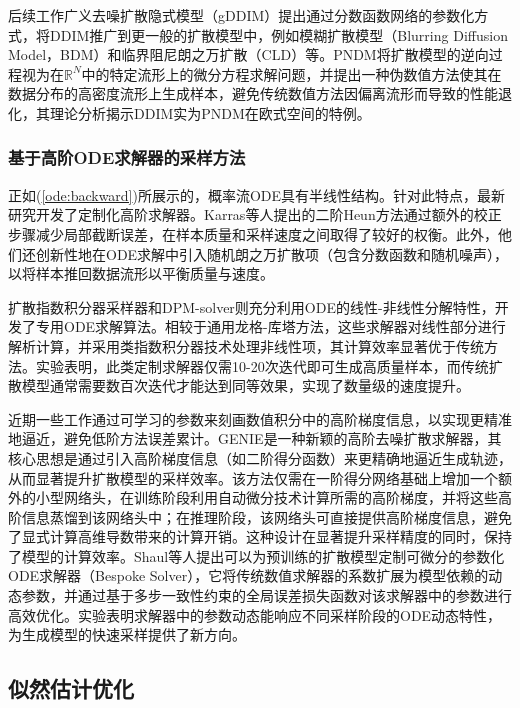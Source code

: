 \documentclass[11pt,a4paper,UTF8]{ctexart}
\begin{document}
后续工作广义去噪扩散隐式模型（gDDIM）\cite{zhang2022gddim}提出通过分数函数网络的参数化方式，将DDIM推广到更一般的扩散模型中，例如模糊扩散模型（Blurring Diffusion Model，BDM）\cite{Hoogeboom2023blurring}和临界阻尼朗之万扩散（CLD）\cite{dockhorn2021score}等。PNDM\cite{liu2021pseudo}将扩散模型的逆向过程视为在$\mathbb{R}^N$中的特定流形上的微分方程求解问题，并提出一种伪数值方法使其在数据分布的高密度流形上生成样本，避免传统数值方法因偏离流形而导致的性能退化，其理论分析揭示DDIM实为PNDM在欧式空间的特例。


\subsubsection{基于高阶ODE求解器的采样方法}

正如(\ref{ode:backward})所展示的，概率流ODE具有半线性结构。针对此特点，最新研究开发了定制化高阶求解器。Karras等人\cite{karras2022elucidating}提出的二阶Heun方法\cite{ascher1998computer}通过额外的校正步骤减少局部截断误差，在样本质量和采样速度之间取得了较好的权衡。此外，他们还创新性地在ODE求解中引入随机朗之万扩散项（包含分数函数和随机噪声），以将样本推回数据流形以平衡质量与速度。

扩散指数积分器采样器\cite{zhang2022fast}和DPM-solver\cite{lu2022dpm}则充分利用ODE的线性-非线性分解特性，开发了专用ODE求解算法。相较于通用龙格-库塔方法，这些求解器对线性部分进行解析计算，并采用类指数积分器技术处理非线性项，其计算效率显著优于传统方法。实验表明，此类定制求解器仅需10-20次迭代即可生成高质量样本，而传统扩散模型通常需要数百次迭代才能达到同等效果，实现了数量级的速度提升。

近期一些工作通过可学习的参数来刻画数值积分中的高阶梯度信息，以实现更精准地逼近，避免低阶方法误差累计。GENIE\cite{dockhorn2022genie}是一种新颖的高阶去噪扩散求解器，其核心思想是通过引入高阶梯度信息（如二阶得分函数）来更精确地逼近生成轨迹，从而显著提升扩散模型的采样效率。该方法仅需在一阶得分网络基础上增加一个额外的小型网络头，在训练阶段利用自动微分技术计算所需的高阶梯度，并将这些高阶信息蒸馏到该网络头中；在推理阶段，该网络头可直接提供高阶梯度信息，避免了显式计算高维导数带来的计算开销。这种设计在显著提升采样精度的同时，保持了模型的计算效率。Shaul等人\cite{shaul2023bespoke}提出可以为预训练的扩散模型定制可微分的参数化ODE求解器（Bespoke Solver），它将传统数值求解器的系数扩展为模型依赖的动态参数，并通过基于多步一致性约束的全局误差损失函数对该求解器中的参数进行高效优化。实验表明求解器中的参数动态能响应不同采样阶段的ODE动态特性，为生成模型的快速采样提供了新方向。



\subsection{似然估计优化}
\end{document}
